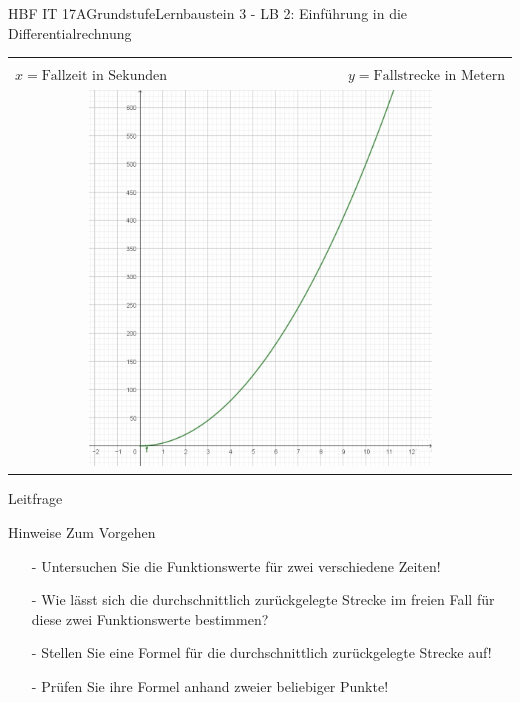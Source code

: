 \documentclass[oneside,openany,headings=optiontotoc,11pt,numbers=noenddot]{scrreprt}
\begin{document}
	\begin{worksheet}{HBF IT 17A}{Grundstufe}{Lernbaustein 3 - LB 2: Einführung in die Differentialrechnung}
		
		\noindent
		\begin{framed}
			\begin{center}
				\begin{tabular}{lcr}				
					\multicolumn{3}{c}{\fbox{\(f(x) = 5x^{2}\)}}\\
					\( x = \text{Fallzeit in Sekunden}\) &  & \( y = \text{Fallstrecke in Metern}\)\\
					\multicolumn{3}{c}{\includegraphics[width=0.7\textwidth]{Bilder/20180219-EinDiffFall.jpg}}
				\end{tabular}
			\end{center}
		\end{framed}

		\setlength{\fboxsep}{1mm}
		\begin{framed}
			\tiny{\color{codegray}Leitfrage}\\
			\par
			\bigskip
		\end{framed}
	
		\begin{framed}
			\tiny{\color{codegray}Hinweise Zum Vorgehen}
			\normalsize
			\color{black}
				\begin{itemize}
					\itemsep0em
					\item[-] Untersuchen Sie die Funktionswerte für zwei verschiedene Zeiten!\\
					\item[-] Wie lässt sich die durchschnittlich zurückgelegte Strecke im freien Fall für diese zwei Funktionswerte bestimmen?\\
					\item[-] Stellen Sie eine Formel für die durchschnittlich zurückgelegte Strecke auf!\\
					\item[-] Prüfen Sie ihre Formel anhand zweier beliebiger Punkte!
				\end{itemize}
		\end{framed}
	

\end{worksheet}
\end{document}
